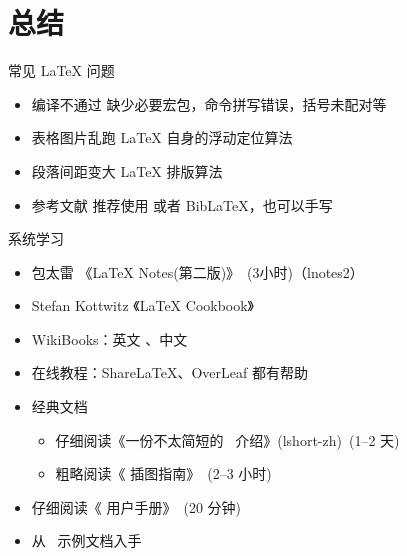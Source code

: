 
\section{总结}

\begin{frame}{常见 \LaTeX{} 问题}
  \begin{itemize}
    \item \alert{编译不通过} 缺少必要宏包，命令拼写错误，括号未配对等
    \item \alert{表格图片乱跑} \LaTeX{} 自身的浮动定位算法
    \item \alert{段落间距变大} \LaTeX{} 排版算法
    \item \alert{参考文献} 推荐使用 \BibTeX{} 或者 Bib\LaTeX{}，也可以手写  
  \end{itemize}
\end{frame}

\begin{frame}{系统学习}
  \begin{itemize}
      \item 包太雷 《\LaTeX{} Notes(第二版)》~(3小时)（lnotes2） 
      \item Stefan Kottwitz 《LaTeX Cookbook》
      \item WikiBooks：英文 、中文 
      \item 在线教程：ShareLaTeX、OverLeaf 都有帮助
      \item 经典文档
        \begin{itemize}
          \item 仔细阅读《一份不太简短的~\LaTeXe{} 介绍》(lshort-zh)~(1--2 天)
          \item 粗略阅读《\LaTeXe{} 插图指南》~(2--3 小时)
        \end{itemize}
      \item 仔细阅读《\ThuThesis{} 用户手册》~(20 分钟)
      \item 从~\ThuThesis{} 示例文档入手
  \end{itemize}
\end{frame}

